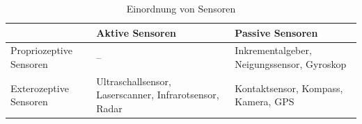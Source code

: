 \begin{table}[ht]
	\begin{tabular}{|p{}|p{}|p{}|} \hline
		     	                & Aktive Sensoren      & Passive Sensoren   \\ \hline
		Propriozeptive Sensoren & 
			-- & 
			Inkrementalgeber, \newline Neigungssensor, \newline Gyroskop   \\ \hline
		Exterozeptive Sensoren  & 
			Ultraschallsensor,  \newline Laserscanner, \newline Infrarotsensor, \newline Radar    & 
			Kontaktsensor, \newline Kompass, \newline Kamera, \newline GPS      \\ \hline 
	\end{tabular}
	\centering
	\caption[Einordnung von Sensoren]{Einordnung von Sensoren}
\end{table}
